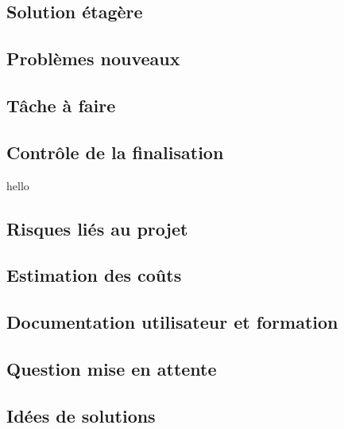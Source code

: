 		\subsection{Solution étagère}
		
		\subsection{Problèmes nouveaux}
		
		\subsection{Tâche à faire}
		
		\subsection{Contrôle de la finalisation}
			hello
		\subsection{Risques liés au projet}
		
		\subsection{Estimation des coûts}
		
		\subsection{Documentation utilisateur et formation}
		
		\subsection{Question mise en attente}
		
		\subsection{Idées de solutions}
		


